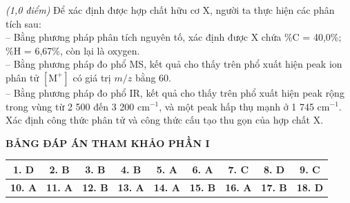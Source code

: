 \documentclass[12pt,a4paper]{article}
\begin{document}
\begin{ex}
\textit{(1,0 điểm)} Để xác định được hợp chất hữu cơ X, người ta thực hiện các phân tích sau:\\
-- Bằng phương pháp phân tích nguyên tố, xác định được X chứa \%C = 40,0\%; \%H = 6,67\%, còn lại là oxygen.\\
-- Bằng phương pháp đo phổ MS, kết quả cho thấy trên phổ xuất hiện peak ion phân tử $[\text{M}^+]$ có giá trị $m/z$ bằng 60.\\
-- Bằng phương pháp đo phổ IR, kết quả cho thấy trên phổ xuất hiện peak rộng trong vùng từ 2 500 đến 3 200 cm$^{-1}$, và một peak hấp thụ mạnh ở 1 745 cm$^{-1}$.\\
Xác định công thức phân tử và công thức cấu tạo thu gọn của hợp chất X.

\end{ex}

\newpage
\noindent\textbf{\large BẢNG ĐÁP ÁN THAM KHẢO PHẦN I}
\vspace{0.2cm}

\begin{center}
\begin{tabular}{|c|c|c|c|c|c|c|c|c|}
\hline
\textbf{1. D} & \textbf{2. B} & \textbf{3. B} & \textbf{4. B} & \textbf{5. A} & \textbf{6. A} & \textbf{7. C} & \textbf{8. D} & \textbf{9. C} \\
\hline
\textbf{10. A} & \textbf{11. A} & \textbf{12. B} & \textbf{13. A} & \textbf{14. A} & \textbf{15. B} & \textbf{16. A} & \textbf{17. B} & \textbf{18. D} \\
\hline
\end{tabular}
\end{center}
\end{document}

